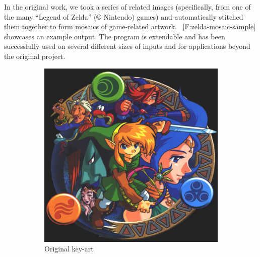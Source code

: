 \documentclass[11pt,conference]{IEEEtran}
\theoremstyle{plain} %
\theoremstyle{definition}
\theoremstyle{remark}
\begin{document}
In the original work, we took a series of related images (specifically, from one
of the many ``Legend of Zelda'' ({\copyright} Nintendo) games) and automatically
stitched them together to form mosaics of game-related artwork.
\figurename~\ref{F:zelda-mosaic-sample} showcases an example output. The program
is extendable and has been successfully used on several different sizes of
inputs and for applications beyond the original project.

\begin{figure}[pht]
    \centering
    \begin{subfigure}{0.35\textwidth}
        \includegraphics[width=\linewidth]{img/oracleofages-original.jpg}
        \caption{Original key-art}
    \end{subfigure}
    \begin{subfigure}{0.35\textwidth}

\end{subfigure}
\end{figure}
\end{document}
